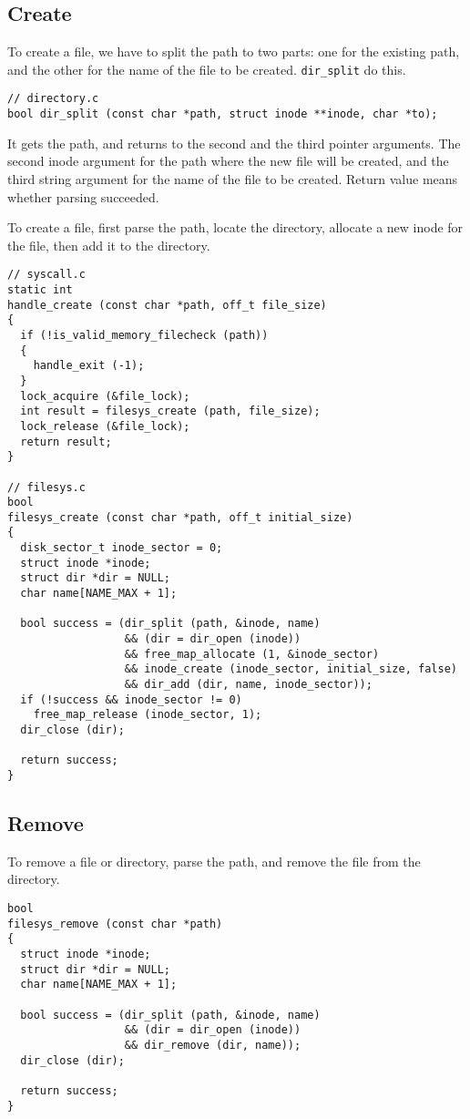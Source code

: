 \documentclass[a4paper,article,11pt,oneside]{article}
\begin{document}
\subsection{Create}
To create a file, we have to split the path to two parts: one for the
existing path, and the other for the name of the file to be
created. \texttt{dir\_split} do this.
\begin{verbatim}
// directory.c
bool dir_split (const char *path, struct inode **inode, char *to);
\end{verbatim}
It gets the path, and returns to the second and the third pointer
arguments. The second inode argument for the path where the new file
will be created, and the third string argument for the name of the
file to be created. Return value means whether parsing succeeded.

To create a file, first parse the path, locate the directory, allocate
a new inode for the file, then add it to the directory.
\begin{verbatim}
// syscall.c
static int
handle_create (const char *path, off_t file_size)
{
  if (!is_valid_memory_filecheck (path))
  {
    handle_exit (-1);
  }
  lock_acquire (&file_lock);
  int result = filesys_create (path, file_size);
  lock_release (&file_lock);
  return result;
}

// filesys.c
bool
filesys_create (const char *path, off_t initial_size) 
{
  disk_sector_t inode_sector = 0;
  struct inode *inode;
  struct dir *dir = NULL;
  char name[NAME_MAX + 1];

  bool success = (dir_split (path, &inode, name)
                  && (dir = dir_open (inode))
                  && free_map_allocate (1, &inode_sector)
                  && inode_create (inode_sector, initial_size, false)
                  && dir_add (dir, name, inode_sector));
  if (!success && inode_sector != 0) 
    free_map_release (inode_sector, 1);
  dir_close (dir);

  return success;
}
\end{verbatim}

\subsection{Remove}
To remove a file or directory, parse the path, and remove the file
from the directory.
\begin{verbatim}
bool
filesys_remove (const char *path)
{
  struct inode *inode;
  struct dir *dir = NULL;
  char name[NAME_MAX + 1];

  bool success = (dir_split (path, &inode, name)
                  && (dir = dir_open (inode))
                  && dir_remove (dir, name));
  dir_close (dir);

  return success;
}
\end{verbatim}
\end{document}
